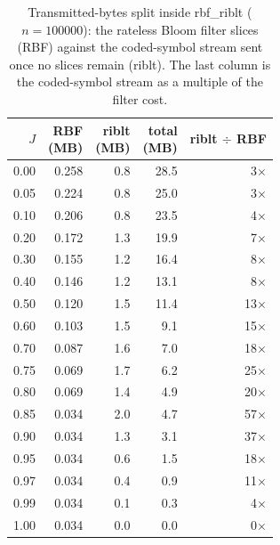 \begin{table}[t]
    \centering
    \caption{Transmitted-bytes split inside rbf\_riblt ($n=100000$): the rateless Bloom filter slices (RBF) against the coded-symbol stream sent once no slices remain (riblt). The last column is the coded-symbol stream as a multiple of the filter cost.}
    \label{tab:bytes-saving}
    \begin{tabular}{rrrrr}
      \toprule
      $J$ & \makecell{RBF\\(MB)} & \makecell{riblt\\(MB)} & \makecell{total\\(MB)} & \makecell{riblt\\$\div$ RBF} \\
      \midrule
      0.00 & 0.258 & 0.8 & 28.5 & 3$\times$ \\
      0.05 & 0.224 & 0.8 & 25.0 & 3$\times$ \\
      0.10 & 0.206 & 0.8 & 23.5 & 4$\times$ \\
      0.20 & 0.172 & 1.3 & 19.9 & 7$\times$ \\
      0.30 & 0.155 & 1.2 & 16.4 & 8$\times$ \\
      0.40 & 0.146 & 1.2 & 13.1 & 8$\times$ \\
      0.50 & 0.120 & 1.5 & 11.4 & 13$\times$ \\
      0.60 & 0.103 & 1.5 & 9.1 & 15$\times$ \\
      0.70 & 0.087 & 1.6 & 7.0 & 18$\times$ \\
      0.75 & 0.069 & 1.7 & 6.2 & 25$\times$ \\
      0.80 & 0.069 & 1.4 & 4.9 & 20$\times$ \\
      0.85 & 0.034 & 2.0 & 4.7 & 57$\times$ \\
      0.90 & 0.034 & 1.3 & 3.1 & 37$\times$ \\
      0.95 & 0.034 & 0.6 & 1.5 & 18$\times$ \\
      0.97 & 0.034 & 0.4 & 0.9 & 11$\times$ \\
      0.99 & 0.034 & 0.1 & 0.3 & 4$\times$ \\
      1.00 & 0.034 & 0.0 & 0.0 & 0$\times$ \\
      \bottomrule
    \end{tabular}
\end{table}
